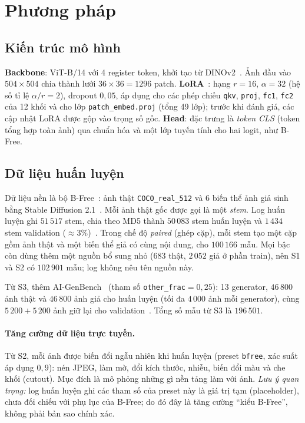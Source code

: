 \documentclass[11pt,a4paper]{article}
\begin{document}
\section{Phương pháp}\label{sec:method}

\subsection{Kiến trúc mô hình}
\textbf{Backbone}: ViT-B/14 với 4 register token, khởi tạo từ DINOv2~\cite{oquab2023dinov2,darcet2024vision,dosovitskiy2021image}. Ảnh đầu vào $504\times504$ chia thành lưới $36\times36=1296$ patch. \textbf{LoRA}~\cite{hu2022lora}: hạng $r=16$, $\alpha=32$ (hệ số tỉ lệ $\alpha/r=2$), dropout $0{,}05$, áp dụng cho các phép chiếu \texttt{qkv}, \texttt{proj}, \texttt{fc1}, \texttt{fc2} của 12 khối và cho lớp \texttt{patch\_embed.proj} (tổng 49 lớp); trước khi đánh giá, các cập nhật LoRA được gộp vào trọng số gốc. \textbf{Head}: đặc trưng là \emph{token CLS} (token tổng hợp toàn ảnh) qua chuẩn hóa và một lớp tuyến tính cho hai logit, như B-Free.

\subsection{Dữ liệu huấn luyện}
Dữ liệu nền là bộ B-Free~\cite{guillaro2025bfree}: ảnh thật \texttt{COCO\_real\_512} và 6 biến thể ảnh giả sinh bằng Stable Diffusion 2.1~\cite{rombach2022highresolution}. Mỗi ảnh thật gốc được gọi là một \emph{stem}. Log huấn luyện ghi $51\,517$ stem, chia theo MD5 thành $50\,083$ stem huấn luyện và $1\,434$ stem validation ($\approx3\%$)~\cite{baopv051_2025_xla_training_s1}. Trong chế độ \emph{paired} (ghép cặp), mỗi stem tạo một cặp gồm ảnh thật và một biến thể giả có cùng nội dung, cho $100\,166$ mẫu. Mọi bậc còn dùng thêm một nguồn bổ sung nhỏ ($683$ thật, $2\,052$ giả ở phần train), nên S1 và S2 có $102\,901$ mẫu; log không nêu tên nguồn này.

Từ S3, thêm AI-GenBench~\cite{pellegrini2025aigenbench,aigenbench2025software} (tham số \texttt{other\_frac}$=0{,}25$): 13 generator, $46\,800$ ảnh thật và $46\,800$ ảnh giả cho huấn luyện (tối đa $4\,000$ ảnh mỗi generator), cùng $5\,200+5\,200$ ảnh giữ lại cho validation~\cite{baopv051_2025_xla_training_s3}. Tổng số mẫu từ S3 là $196\,501$.

\paragraph{Tăng cường dữ liệu trực tuyến.} Từ S2, mỗi ảnh được biến đổi ngẫu nhiên khi huấn luyện (preset \texttt{bfree}, xác suất áp dụng $0{,}9$): nén JPEG, làm mờ, đổi kích thước, nhiễu, biến đổi màu và che khối (cutout). Mục đích là mô phỏng những gì nền tảng làm với ảnh. \emph{Lưu ý quan trọng:} log huấn luyện ghi các tham số của preset này là giá trị tạm (placeholder), chưa đối chiếu với phụ lục của B-Free; do đó đây là tăng cường ``kiểu B-Free'', không phải bản sao chính xác.
\end{document}
